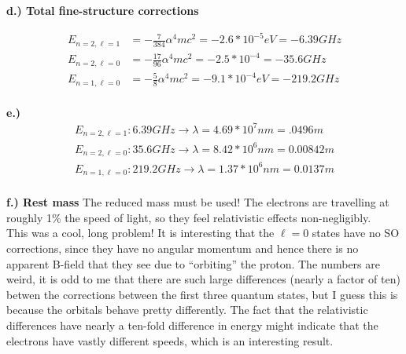 \documentclass[10pt]{article} %
\begin{document}
\textbf{d.) Total fine-structure corrections}

\begin{align*}
  E_{n=2,\ell=1} &= -\frac{7}{384}\alpha^4mc^2 = -2.6*10^{-5} eV = -6.39 GHz\\
  E_{n=2,\ell=0} &= -\frac{17}{96}\alpha^4mc^2 = -2.5*10^{-4} = -35.6 GHz\\
  E_{n=1,\ell=0} &= -\frac{5}{8}\alpha^4mc^2 = -9.1*10^{-4} eV = -219.2 GHz\\
\end{align*}

\textbf{e.) }
\begin{align*}
  E_{n=2,\ell=1}: 6.39 GHz \rightarrow \lambda = 4.69*10^7 nm = .0496m\\
  E_{n=2,\ell=0}: 35.6 GHz \rightarrow \lambda = 8.42*10^6 nm = 0.00842m\\
  E_{n=1,\ell=0}: 219.2 GHz \rightarrow \lambda = 1.37*10^6 nm = 0.0137m\\
\end{align*}

\textbf{f.) Rest mass}
The reduced mass must be used! The electrons are travelling at roughly 1\% the speed
of light, so they feel relativistic effects non-negligibly.\\

This was a cool, long problem! It is interesting that the $\ell=0$ states have no
SO corrections, since they have no angular momentum and hence there is no apparent
B-field that they see due to ``orbiting'' the proton. The numbers are weird, it is odd
to me that there are such large differences (nearly a factor of ten) betwen the
corrections between the first three quantum states, but I guess this is because
the orbitals behave pretty differently. The fact that the relativistic differences
have nearly a ten-fold difference in energy might indicate that the electrons have
vastly different speeds, which is an interesting result.\\
\end{document}
